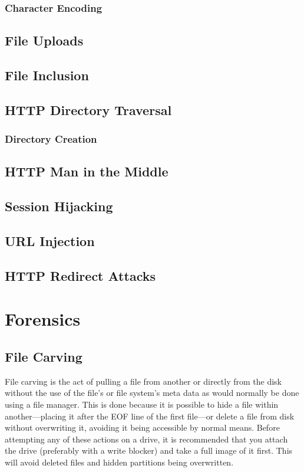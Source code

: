 \documentclass[a4paper,11pt]{report}
\begin{document}
		\subsection{Character Encoding}
	\section{File Uploads}
	\section{File Inclusion}
	\section{HTTP Directory Traversal}
		\subsection{Directory Creation}
	\section{HTTP Man in the Middle}
	\section{Session Hijacking}
	\section{URL Injection}
	\section{HTTP Redirect Attacks}
\chapter{Forensics}
	\label{ch:Forensics}
	\section{File Carving}
		File carving is the act of pulling a file from another or directly from the disk without the use of the file's or file system's meta data as would normally be done using a file manager. 
		This is done because it is possible to hide a file within another---placing it after the EOF line of the first file---or delete a file from disk without overwriting it, avoiding it being accessible by normal means. 
		Before attempting any of these actions on a drive, it is recommended that you attach the drive (preferably with a write blocker) and take a full image of it first. 
		This will avoid deleted files and hidden partitions being overwritten. 
\end{document}
